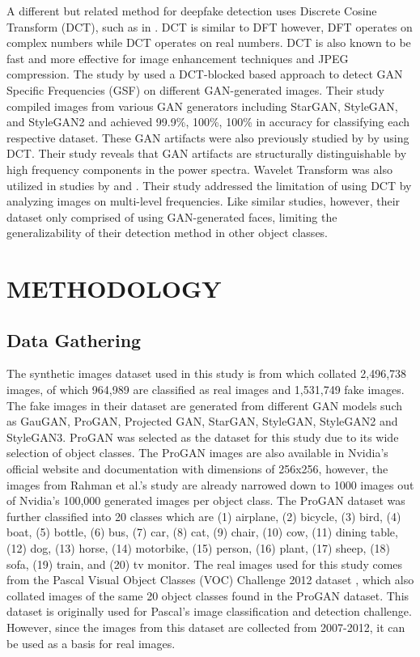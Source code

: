 \documentclass{icsthesis}
\begin{document}
\begin{mainmatter}
A different but related method for deepfake detection uses Discrete Cosine Transform (DCT), such as in \cite{dct-patchlevel, fighting-dct, lev-freq-dct}. DCT is similar to DFT however, DFT operates on complex numbers while DCT operates on real numbers. DCT is also known to be fast and more effective for image enhancement techniques \cite{dct-review} and JPEG compression. The study by \cite{fighting-dct} used a DCT-blocked based approach to detect GAN Specific Frequencies (GSF) on different GAN-generated images. Their study compiled images from various GAN generators including StarGAN, StyleGAN, and StyleGAN2 and achieved 99.9\%, 100\%, 100\% in accuracy for classifying each respective dataset. These GAN artifacts were also previously studied by \cite{lev-freq-dct} by using DCT. Their study reveals that GAN artifacts are structurally distinguishable by high frequency components in the power spectra. Wavelet Transform was also utilized in studies by \cite{dwt} and \cite{dwt2}. Their study addressed the limitation of using DCT by analyzing images on multi-level frequencies. Like similar studies, however, their dataset only comprised of using GAN-generated faces, limiting the generalizability of their detection method in other object classes.

				
				
		


\section{METHODOLOGY}
\subsection{Data Gathering}

The synthetic images dataset used in this study is from \cite{artifact-dataset} which collated 2,496,738 images, of which 964,989 are classified as real images and 1,531,749 fake images. The fake images in their dataset are generated from different GAN models such as GauGAN, ProGAN, Projected GAN, StarGAN, StyleGAN, StyleGAN2 and StyleGAN3. ProGAN was selected as the dataset for this study due to its wide selection of object classes. The ProGAN images are also available in Nvidia's official website and documentation \citep{progan-nvidia} with dimensions of 256x256, however, the images from Rahman et al.'s study are already narrowed down to 1000 images out of Nvidia's 100,000 generated images per object class. The ProGAN dataset was further classified into 20 classes which are (1) airplane, (2) bicycle, (3) bird, (4) boat, (5) bottle, (6) bus, (7) car, (8) cat, (9) chair, (10) cow, (11) dining table, (12) dog, (13) horse, (14) motorbike, (15) person, (16) plant, (17) sheep, (18) sofa, (19) train, and (20) tv monitor. The real images used for this study comes from the Pascal Visual Object Classes (VOC) Challenge 2012 dataset \citep{pascal-voc-2012}, which also collated images of the same 20 object classes found in the ProGAN dataset. This dataset is originally used for Pascal's image classification and detection challenge. However, since the images from this dataset are collected from 2007-2012, it can be used as a basis for real images. 


\end{mainmatter}
\end{document}
